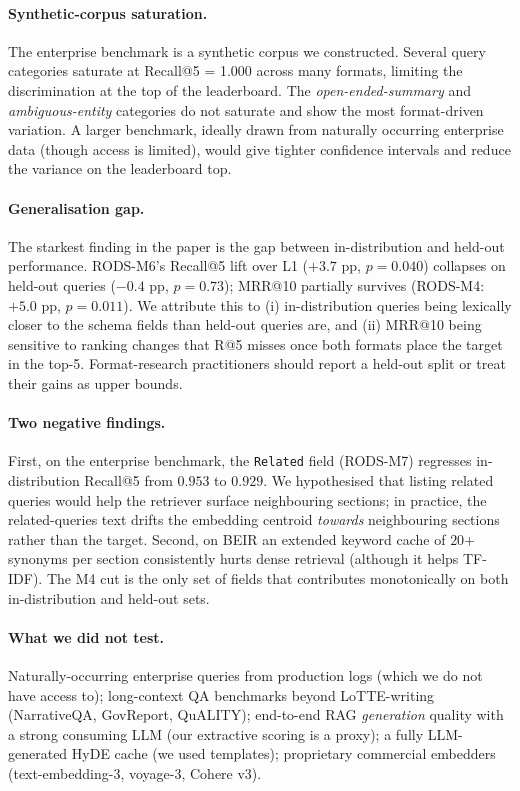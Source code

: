 \documentclass[11pt]{article}
\begin{document}
\paragraph{Synthetic-corpus saturation.}
The enterprise benchmark is a synthetic corpus we constructed. Several
query categories saturate at Recall@5 = 1.000 across many formats,
limiting the discrimination at the top of the leaderboard. The
\textit{open-ended-summary} and \textit{ambiguous-entity} categories
do not saturate and show the most format-driven variation. A larger
benchmark, ideally drawn from naturally occurring enterprise data
(though access is limited), would give tighter confidence intervals
and reduce the variance on the leaderboard top.

\paragraph{Generalisation gap.} The starkest finding in the paper is
the gap between in-distribution and held-out performance. RODS-M6's
Recall@5 lift over L1 ($+3.7$ pp, $p{=}0.040$) collapses on held-out
queries ($-0.4$ pp, $p{=}0.73$); MRR@10 partially survives (RODS-M4:
$+5.0$ pp, $p{=}0.011$). We attribute this to (i) in-distribution
queries being lexically closer to the schema fields than held-out
queries are, and (ii) MRR@10 being sensitive to ranking changes that
R@5 misses once both formats place the target in the top-5.
Format-research practitioners should report a held-out split or treat
their gains as upper bounds.

\paragraph{Two negative findings.}
First, on the enterprise benchmark, the \texttt{Related} field
(RODS-M7) regresses in-distribution Recall@5 from $0.953$ to $0.929$.
We hypothesised that listing related queries would help the retriever
surface neighbouring sections; in practice, the related-queries text
drifts the embedding centroid \emph{towards} neighbouring sections
rather than the target. Second, on BEIR an extended keyword cache of
$20$+ synonyms per section consistently hurts dense retrieval
(although it helps TF-IDF). The M4 cut is the only set of fields
that contributes monotonically on both in-distribution and held-out
sets.

\paragraph{What we did not test.}
Naturally-occurring enterprise queries from production logs (which we
do not have access to); long-context QA benchmarks beyond
LoTTE-writing (NarrativeQA, GovReport, QuALITY); end-to-end RAG
\emph{generation} quality with a strong consuming LLM (our extractive
scoring is a proxy); a fully LLM-generated HyDE cache (we used
templates); proprietary commercial embedders (text-embedding-3,
voyage-3, Cohere v3).
\end{document}
